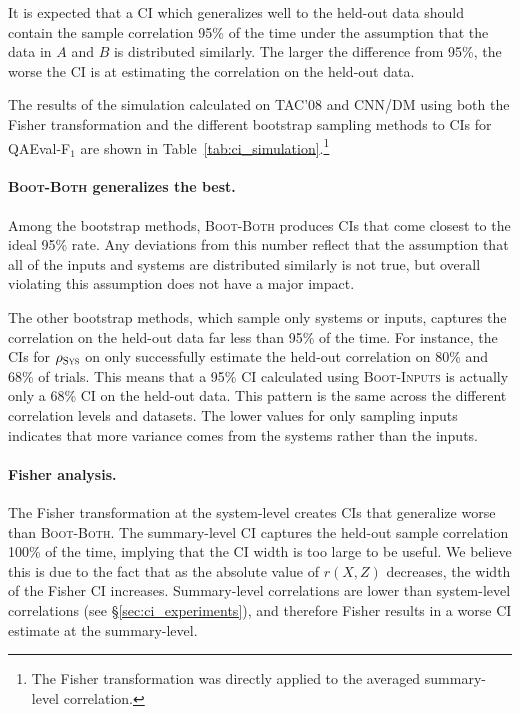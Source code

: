 It is expected that a CI which generalizes well to the held-out data should contain the sample correlation 95\% of the time under the assumption that the data in $A$ and $B$ is distributed similarly.
The larger the difference from 95\%, the worse the CI is at estimating the correlation on the held-out data.



The results of the simulation calculated on TAC'08 and CNN/DM using both the Fisher transformation and the different bootstrap sampling methods to CIs for QAEval-F$_1$ \citep{DeutschBeRo20} are shown in Table~\ref{tab:ci_simulation}.\footnote{
    The Fisher transformation was directly applied to the averaged summary-level correlation.
}

\paragraph{\textsc{Boot-Both} generalizes the best.}
Among the bootstrap methods, \textsc{Boot-Both} produces CIs that come closest to the ideal 95\% rate.
Any deviations from this number reflect that the assumption that all of the inputs and systems are distributed similarly is not true, but overall violating this assumption does not have a major impact.

The other bootstrap methods, which sample only systems or inputs, captures the correlation on the held-out data far less than 95\% of the time.
For instance, the CIs for $\rho_\textsc{Sys}$ on \citet{BGALN20} only successfully estimate the held-out correlation on 80\% and 68\% of trials.
This means that a 95\% CI calculated using \textsc{Boot-Inputs} is actually only a 68\% CI on the held-out data.
This pattern is the same across the different correlation levels and datasets.
The lower values for only sampling inputs indicates that more variance comes from the systems rather than the inputs.

\paragraph{Fisher analysis.}
The Fisher transformation at the system-level creates CIs that generalize worse than \textsc{Boot-Both}.
The summary-level CI captures the held-out sample correlation 100\% of the time, implying that the CI width is too large to be useful.
We believe this is due to the fact that as the absolute value of $r(X, Z)$ decreases, the width of the Fisher CI increases.
Summary-level correlations are lower than system-level correlations (see \S\ref{sec:ci_experiments}), and therefore Fisher results in a worse CI estimate at the summary-level.

